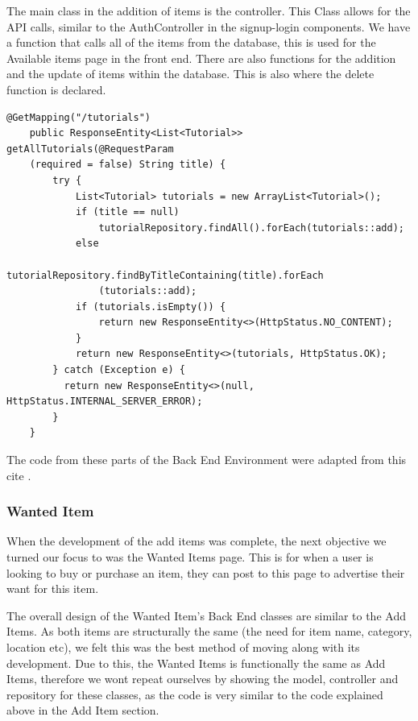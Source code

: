 The main class in the addition of items is the controller. This Class allows for the API calls, similar to the AuthController in the signup-login components. We have a function that calls all of the items from the database, this is used for the Available items page in the front end. There are also functions for the addition and the update of items within the database. This is also where the delete function is declared.
\begin{verbatim}
@GetMapping("/tutorials")
    public ResponseEntity<List<Tutorial>> getAllTutorials(@RequestParam
    (required = false) String title) {
        try {
            List<Tutorial> tutorials = new ArrayList<Tutorial>();
            if (title == null)
                tutorialRepository.findAll().forEach(tutorials::add);
            else
                tutorialRepository.findByTitleContaining(title).forEach
                (tutorials::add);
            if (tutorials.isEmpty()) {
                return new ResponseEntity<>(HttpStatus.NO_CONTENT);
            }
            return new ResponseEntity<>(tutorials, HttpStatus.OK);
        } catch (Exception e) {
          return new ResponseEntity<>(null, HttpStatus.INTERNAL_SERVER_ERROR);
        }
    }
\end{verbatim}
The code from these parts of the Back End Environment were adapted from this cite \cite{zKoder}.

\subsubsection{Wanted Item}
When the development of the add items was complete, the next objective we turned our focus to was the Wanted Items page. This is for when a user is looking to buy or purchase an item, they can post to this page to advertise their want for this item. \par
The overall design of the Wanted Item's Back End classes are similar to the Add Items. As both items are structurally the same (the need for item name, category, location etc), we felt this was the best method of moving along with its development. Due to this, the Wanted Items is functionally the same as Add Items, therefore we wont repeat ourselves by showing the model, controller and repository for these classes, as the code is very similar to the code explained above in the Add Item section. \par

